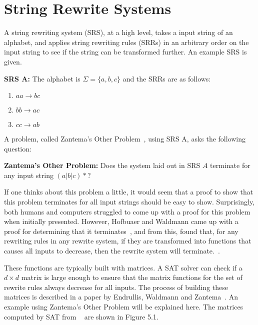 \section{String Rewrite Systems}
A string rewriting system (SRS), at a high level, takes a input string of an alphabet, and applies string rewriting rules (SRRs) in an arbitrary order on the input string to see if the string can be transformed further.  An example SRS is given.\par\noindent
\textbf{SRS A:} The alphabet is $\Sigma = \{a, b, c\}$ and the SRRs are as follows:
\begin{enumerate}
    \item $aa \rightarrow bc$
    \item $bb \rightarrow ac$
    \item $cc \rightarrow ab$
\end{enumerate}
A problem, called Zantema's Other Problem~\cite{Hofbauer:2006:TA:1142725.1711178}, using SRS A, asks the following question:\par\noindent
\textbf{Zantema's Other Problem:}
Does the system laid out in SRS $A$ terminate for any input string $(a|b|c)*$?\par
If one thinks about this problem a little, it would seem that a proof to show that this problem terminates for all input strings should be easy to show.  Surprisingly, both humans and computers struggled to come up with a proof for this problem when initially presented.  However, Hofbuaer and Waldmann came up with a proof for determining that it terminates~\cite{Hofbauer:2006:TA:1142725.1711178}, and from this, found that, for any rewriting rules in any rewrite system, if they are transformed into functions that causes all inputs to decrease, then the rewrite system will terminate.~\cite{Hofbauer2006}. \par
These functions are typically built with matrices. A SAT solver can check if a $d \times d$ matrix is large enough to ensure that the matrix functions for the set of rewrite rules always decrease for all inputs. The process of building these matrices is described in a paper by Endrullis, Waldmann and Zantema~\cite{Endrullis2006}. An example using Zantema's Other Problem will be explained here. The matrices computed by SAT from ~\cite{Hofbauer:2006:TA:1142725.1711178} are shown in Figure 5.1. \par%
